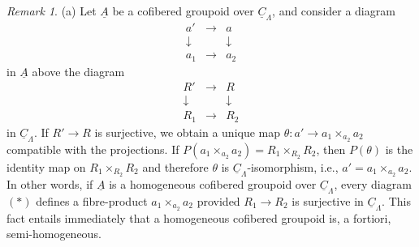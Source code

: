 \documentclass[11pt]{article}
\theoremstyle{plain}
\theoremstyle{definition}
\theoremstyle{remark}
\newtheorem{remark}[theorem]{Remark}
\newcommand{\uA}{\underline{A}}\newcommand{\uH}{\underline{H}}\newcommand{\uExt}{\underline{\operatorname{Ext}}}\newcommand{\uL}{\underline{L}}\newcommand{\uM}{\underline{M}}\newcommand{\uZ}{\underline{Z}}\newcommand{\uB}{\underline{B}}\newcommand{\uC}{\underline{C}}\newcommand{\uD}{\underline{D}}\newcommand{\uE}{\underline{E}}\newcommand{\uG}{\underline{G}}\newcommand{\uP}{\underline{P}}\newcommand{\uQ}{\underline{Q}}
\begin{document}
\begin{remark}
\textup{(a)} Let $\uA$ be a cofibered groupoid over $\underline{C}_{\Lambda}$, and consider a diagram
\[
\begin{array}{ccc}
a' & \longrightarrow & a \\
\downarrow & & \downarrow \\
a_1 & \longrightarrow & a_2
\end{array}
\]
in $\uA$ above the diagram
\[
\begin{array}{ccc}
R' & \longrightarrow & R \\
\downarrow & & \downarrow \\
R_1 & \longrightarrow & R_2
\end{array}
\]
in $\underline{C}_{\Lambda}$. If $R' \to R$ is surjective, we obtain a unique map $\theta : a' \to a_1 \times_{a_2} a_2$ compatible with the projections. If $P(a_1 \times_{a_2} a_2) = R_1 \times_{R_2} R_2$, then $P(\theta)$ is the identity map on $R_1 \times_{R_2} R_2$ and therefore $\theta$ is $\underline{C}_{\Lambda}$-isomorphism, i.e., $a' = a_1 \times_{a_2} a_2$. In other words, if $\uA$ is a homogeneous cofibered groupoid over $\underline{C}_{\Lambda}$, every diagram $(*)$ defines a fibre-product $a_1 \times_{a_2} a_2$ provided $R_1 \to R_2$ is surjective in $\underline{C}_{\Lambda}$. This fact entails immediately that a homogeneous cofibered groupoid is, a fortiori, semi-homogeneous.


\end{remark}
\end{document}
